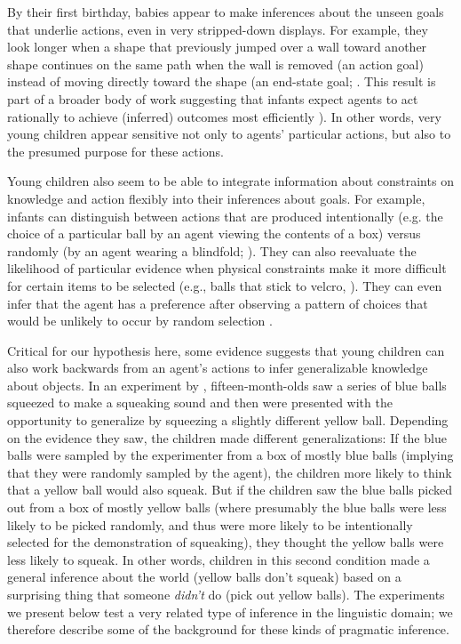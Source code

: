 \documentclass[man]{apa2}
\begin{document}

By their first birthday, babies appear to make inferences about the unseen goals that underlie actions, even in very stripped-down displays.  For example, they look longer when a shape that previously jumped over a wall toward another shape continues on the same path when the wall is removed (an action goal) instead of moving directly toward the shape (an end-state goal; . This result is part of a broader body of work suggesting that infants expect agents to act rationally to achieve (inferred) outcomes most efficiently \cite{csibra1998, gergely2003}). In other words, very young children appear sensitive not only to agents' particular actions, but also to the presumed purpose for these actions. 

Young children also seem to be able to integrate information about constraints on knowledge and action flexibly into their inferences about goals. For example, infants can distinguish between actions that are produced intentionally (e.g. the choice of a particular ball by an agent viewing the contents of a box) versus randomly (by an agent wearing a blindfold; ).  They can also reevaluate the likelihood of particular evidence when physical constraints make it more difficult for certain items to be selected (e.g., balls that stick to velcro, ).  They can even infer that the agent has a preference after observing a pattern of choices that would be unlikely to occur by random selection \cite{kushnir2010}. 

Critical for our hypothesis here, some evidence suggests that young children can also work backwards from an agent's actions to infer generalizable knowledge about objects. In an experiment by , fifteen-month-olds saw a series of blue balls squeezed to make a squeaking sound and then were presented with the opportunity to generalize by squeezing a slightly different yellow ball. Depending on the evidence they saw, the children made different generalizations: If the blue balls were sampled by the experimenter from a box of mostly blue balls (implying that they were randomly sampled by the agent), the children more likely to think that a yellow ball would also squeak. But if the children saw the blue balls picked out from a box of mostly yellow balls (where presumably the blue balls were less likely to be picked randomly, and thus were more likely to be intentionally selected for the demonstration of squeaking), they thought the yellow balls were less likely to squeak. In other words, children in this second condition made a general inference about the world (yellow balls don't squeak) based on a surprising thing that someone \emph{didn't} do (pick out yellow balls). The experiments we present below test a very related type of inference in the linguistic domain; we therefore describe some of the background for these kinds of pragmatic inference. 
\end{document}
